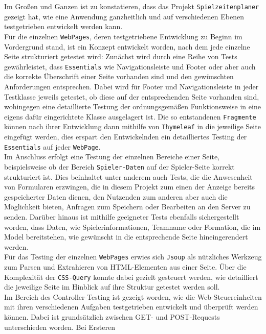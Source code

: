 
Im Großen und Ganzen ist zu konstatieren, dass das Projekt \texttt{Spielzeitenplaner} 
gezeigt hat, wie eine Anwendung ganzheitlich und auf verschiedenen Ebenen testgetrieben 
entwickelt werden kann. \\ 
Für die einzelnen \texttt{WebPages}, deren testgetriebene Entwicklung zu Beginn im 
Vordergrund stand, ist ein Konzept entwickelt worden, nach dem jede einzelne Seite 
strukturiert getestet wird: Zunächst wird durch eine Reihe von Tests gewährleistet, dass 
\texttt{Essentials} wie Navigationsleiste und Footer oder aber auch die korrekte 
Überschrift einer Seite vorhanden sind und den gewünschten Anforderungen entsprechen. 
Dabei wird für Footer und Navigationsleiste in jeder Testklasse jeweils getestet, ob 
diese auf der entsprechenden Seite vorhanden sind, wohingegen eine detaillierte Testung 
der ordnungsgemäßen Funktionsweise in eine eigens dafür eingerichtete Klasse ausgelagert 
ist. Die so entstandenen \texttt{Fragmente} können nach ihrer Entwicklung dann mithilfe 
von \texttt{Thymeleaf} in die jeweilige Seite eingefügt werden, dies erspart den 
Entwickelnden ein detailliertes Testing der \texttt{Essentials} auf jeder 
\texttt{WebPage}. \\ 
Im Anschluss erfolgt eine Testung der einzelnen Bereiche einer Seite, beispielsweise ob 
der Bereich \texttt{Spieler-Daten} auf der Spieler-Seite korrekt strukturiert ist. 
Dies beinhaltet unter anderem auch Tests, die die Anwesenheit von Formularen erzwingen, 
die in diesem Projekt zum einen der Anzeige bereits gespeicherter Daten dienen, den 
Nutzenden zum anderen aber auch die Möglichkeit bieten, Anfragen zum Speichern oder 
Bearbeiten an den Server zu senden. Darüber hinaus ist mithilfe geeigneter Tests 
ebenfalls sichergestellt worden, dass Daten, wie Spielerinformationen, Teamname oder 
Formation, die im Model bereitstehen, wie gewünscht in die entsprechende Seite 
hineingerendert werden. \\ 
Für das Testing der einzelnen \texttt{WebPages} erwies sich \texttt{Jsoup} als nützliches Werkzeug zum Parsen und Extrahieren von HTML-Elementen aus einer Seite. Über die 
Komplexität der \texttt{CSS-Query} konnte dabei gezielt gesteuert werden, wie 
detailliert die jeweilige Seite im Hinblick auf ihre Struktur getestet werden soll. \\ 
Im Bereich des Controller-Testing ist gezeigt worden, wie die Web-Steuereinheiten mit 
ihren verschiedenen Aufgaben testgetrieben entwickelt und überprüft werden können. Dabei 
ist grundsätzlich zwischen GET- und POST-Requests unterschieden worden. Bei Ersteren 

